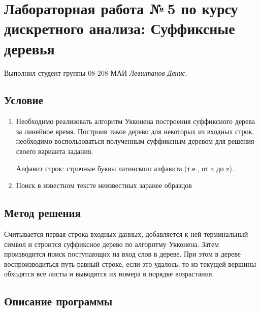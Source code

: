 \documentclass[12pt]{article}
\begin{document}
\section*{Лабораторная работа №\,5 по курсу дискретного анализа: Суффиксные деревья}

Выполнил студент группы 08-208 МАИ \textit{Левштанов Денис}.

\subsection*{Условие}

\begin{enumerate}
\item Необходимо реализовать алгоритм Укконена построения суффиксного дерева за линейное время. Построив такое дерево для некоторых из входных строк, необходимо воспользоваться полученным суффиксным деревом для решения своего варианта задания.

Алфавит строк: строчные буквы латинского алфавита (т.е., от a до z).
\item Поиск в известном тексте неизвестных заранее образцов
\end{enumerate}

\subsection*{Метод решения}
\par Считывается первая строка входных данных, добавляется к ней терминальный символ и строится суффиксное дерево по алгоритму Укконена. Затем производится поиск поступающих на вход слов в дереве. При этом в дереве воспроизводиться путь равный строке, если это удалось, то из текущей вершины обходятся все листы и выводятся их номера в порядке возрастания.

\subsection*{Описание программы}
\end{document}
